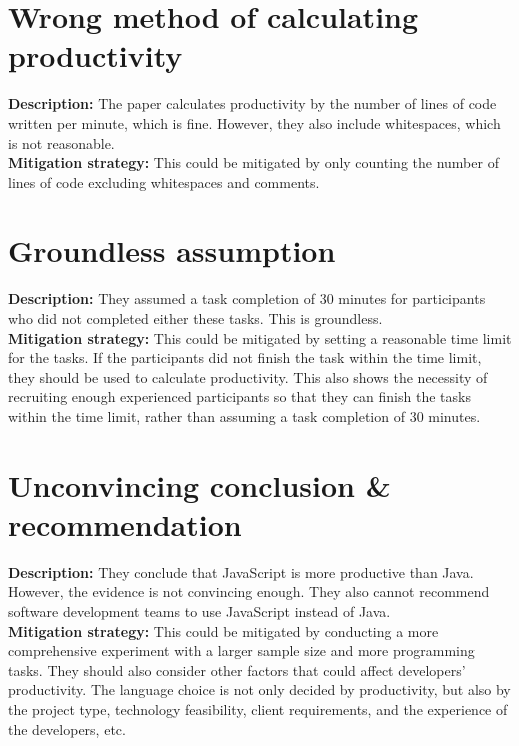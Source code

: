 \documentclass{article}
\begin{document}
\section{Wrong method of calculating productivity}
\textbf{Description:} The paper calculates productivity by the number of lines of code written per minute, which is fine. However, they also include whitespaces, which is not reasonable.\\
\textbf{Mitigation strategy:} This could be mitigated by only counting the number of lines of code excluding whitespaces and comments.

\section{Groundless assumption}
\textbf{Description:} They assumed a task completion of 30 minutes for participants who did not completed either these tasks. This is groundless.\\
\textbf{Mitigation strategy:} This could be mitigated by setting a reasonable time limit for the tasks. If the participants did not finish the task within the time limit, they should be used to calculate productivity. This also shows the necessity of recruiting enough experienced participants so that they can finish the tasks within the time limit, rather than assuming a task completion of 30 minutes.

\section{Unconvincing conclusion \& recommendation}
\textbf{Description:} They conclude that JavaScript is more productive than Java. However, the evidence is not convincing enough. They also cannot recommend software development teams to use JavaScript instead of Java.\\
\textbf{Mitigation strategy:} This could be mitigated by conducting a more comprehensive experiment with a larger sample size and more programming tasks. They should also consider other factors that could affect developers' productivity. The language choice is not only decided by productivity, but also by the project type, technology feasibility, client requirements, and the experience of the developers, etc.
\end{document}
